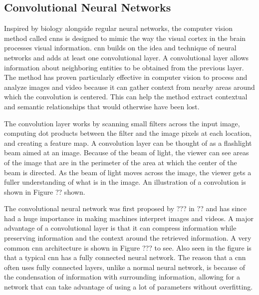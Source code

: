     
    \subsection{Convolutional Neural Networks}

    Inspired by biology alongside regular neural networks, the computer vision method called \glspl{cnn} is designed to mimic the way the visual cortex in the brain processes visual information. \gls{cnn} builds on the idea and technique of neural networks and adds at least one convolutional layer. A convolutional layer allows information about neighboring entities to be obtained from the previous layer. The method has proven particularly effective in computer vision to process and analyze images and video because it can gather context from nearby areas around which the convolution is centered. This can help the method extract contextual and semantic relationships that would otherwise have been lost.

    The convolution layer works by scanning small filters across the input image, computing dot products between the filter and the image pixels at each location, and creating a feature map. A convolution layer can be thought of as a flashlight beam aimed at an image. Because of the beam of light, the viewer can see areas of the image that are in the perimeter of the area at which the center of the beam is directed. As the beam of light moves across the image, the viewer gets a fuller understanding of what is in the image. An illustration of a convolution is shown in Figure ?? shown.

    The convolutional neural network was first proposed by ??? in ?? and has since had a huge importance in making machines interpret images and videos. A major advantage of a convolutional layer is that it can compress information while preserving information and the context around the retrieved information. A very common \gls{cnn} architecture is shown in Figure ??? to see. Also seen in the figure is that a typical \gls{cnn} has a fully connected neural network. The reason that a \gls{cnn} often uses fully connected layers, unlike a normal neural network, is because of the condensation of information with surrounding information, allowing for a network that can take advantage of using a lot of parameters without overfitting.  
    

